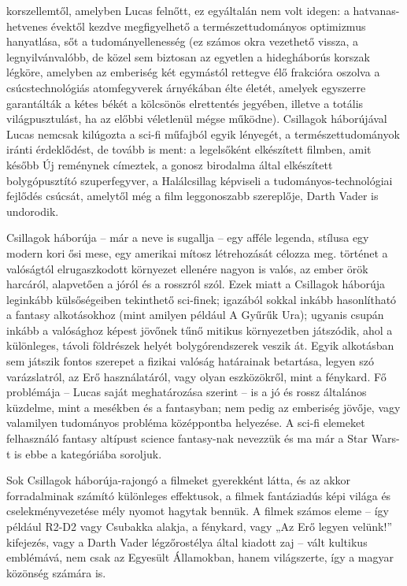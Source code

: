 \documentclass[]{thesis-ekf}
\theoremstyle{definition}
\theoremstyle{remark}
\begin{document}
	\Az korszellemtől, amelyben Lucas felnőtt, ez egyáltalán nem volt idegen: a hatvanas-hetvenes évektől kezdve megfigyelhető a természettudományos optimizmus hanyatlása, sőt a tudományellenesség (ez számos okra vezethető vissza, a legnyilvánvalóbb, de közel sem biztosan az egyetlen a hidegháborús korszak légköre, amelyben az emberiség két egymástól rettegve élő frakcióra oszolva a csúcstechnológiás atomfegyverek árnyékában élte életét, amelyek egyszerre garantálták a kétes békét a kölcsönös elrettentés jegyében, illetve a totális világpusztulást, ha az előbbi véletlenül mégse működne). \Az Csillagok háborújával Lucas nemcsak kilúgozta a sci-fi műfajból egyik lényegét, a természettudományok iránti érdeklődést, de tovább is ment: a legelsőként elkészített filmben, amit később Új reménynek címeztek, a gonosz birodalma által elkészített bolygópusztító szuperfegyver, a Halálcsillag képviseli a tudományos-technológiai fejlődés csúcsát, amelytől még a film leggonoszabb szereplője, Darth Vader is undorodik. 
	
	\Az Csillagok háborúja -- már a neve is sugallja -- egy afféle legenda, stílusa egy modern kori ősi mese, egy amerikai mítosz létrehozását célozza meg. \Az történet a valóságtól elrugaszkodott környezet ellenére nagyon is valós, az ember örök harcáról, alapvetően a jóról és a rosszról szól. Ezek miatt a Csillagok háborúja leginkább külsőségeiben tekinthető sci-finek; igazából sokkal inkább hasonlítható a fantasy alkotásokhoz (mint amilyen például A Gyűrűk Ura); ugyanis csupán inkább a valósághoz képest jövőnek tűnő mitikus környezetben játszódik, ahol a különleges, távoli földrészek helyét bolygórendszerek veszik át. Egyik alkotásban sem játszik fontos szerepet a fizikai valóság határainak betartása, legyen szó varázslatról, az Erő használatáról, vagy olyan eszközökről, mint a fénykard. Fő problémája -- Lucas saját meghatározása szerint -- is a jó és rossz általános küzdelme, mint a mesékben és a fantasyban; nem pedig az emberiség jövője, vagy valamilyen tudományos probléma középpontba helyezése. A sci-fi elemeket felhasználó fantasy altípust science fantasy-nak nevezzük és ma már a Star Wars-t is ebbe a kategóriába soroljuk.
	
	Sok Csillagok háborúja-rajongó a filmeket gyerekként látta, és az akkor forradalminak számító különleges effektusok, a filmek fantáziadús képi világa és cselekményvezetése mély nyomot hagytak bennük. A filmek számos eleme -- így például R2-D2 vagy Csubakka alakja, a fénykard, vagy „Az Erő legyen velünk!” kifejezés, vagy a Darth Vader légzőrostélya által kiadott zaj -- vált kultikus emblémává, nem csak az Egyesült Államokban, hanem világszerte, így a magyar közönség számára is. 
	
\end{document}

